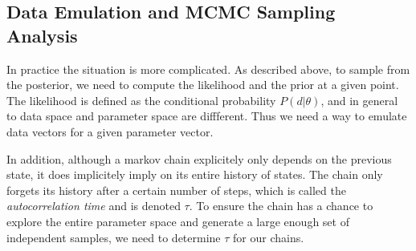\subsection{Data Emulation and MCMC Sampling Analysis}

In practice the situation is more complicated. As described above, to sample from the posterior, we need to compute the likelihood and the prior at a given point. The likelihood is defined as the conditional probability $P(d|\theta)$, and in general to data space and parameter space are diffferent.
Thus we need a way to emulate data vectors for a given parameter vector.

In addition, although a markov chain explicitely only depends on the previous state, it does implicitely imply on its entire history of states. The chain only forgets its history after a certain number of steps, which is called the \textit{autocorrelation time} and is denoted $\tau$. To ensure the chain has a chance to explore the entire parameter space and generate a large enough set of independent samples, we need to determine $\tau$ for our chains.


